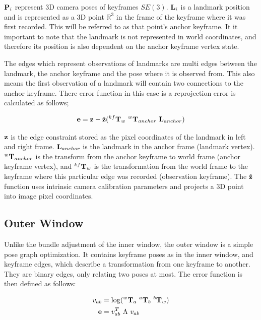 $\mathbf P_i$ represent 3D camera poses of keyframes $SE(3)$.  $\mathbf L_i$ is a landmark position and is represented as a 3D point $\mathbb{R}^3$ in the frame of the keyframe where it was first recorded.  This will be referred to as that point's anchor keyframe.  It it important to note that the landmark is not represented in world coordinates, and therefore its position is also dependent on the anchor keyframe vertex state.

The edges which represent observations of landmarks are multi edges between the landmark, the anchor keyframe and the pose where it is observed from.  This also means the first observation of a landmark will contain two connections to the anchor keyframe. There error function in this case is a reprojection error is calculated as follows;

\begin{align}
 \mathbf e = \mathbf z - \hat{\mathbf z}( ^{kf}\mathbf T_w \ ^w \mathbf T_{anchor} \ \mathbf L_{anchor})
\end{align}

$\mathbf z$ is the edge constraint stored as the pixel coordinates of the landmark in left and right frame. $\mathbf L_{anchor}$ is the landmark in the anchor frame (landmark vertex).  $^w \mathbf T_{anchor}$ is the transform from the anchor keyframe to world frame (anchor keyframe vertex), and $^{kf}\mathbf T_w$ is the transformation from the world frame to the keyframe where this particular edge was recorded (observation keyframe).  The $\hat{\mathbf z}$ function uses intrinsic camera calibration parameters and projects a 3D point into image pixel coordinates.

\subsection{Outer Window}

Unlike the bundle adjustment of the inner window, the outer window is a simple pose graph optimization.  It contains keyframe poses as in the inner window, and keyframe edges, which describe a transformation from one keyframe to another.  They are binary edges, only relating two poses at most.  The error function is then defined as follows:

\begin{align}
 v_{ab} &=  \log(^{w}\mathbf T_{a} \ ^{a} \mathbf T_{b} \ ^{b} \mathbf T_{w}) \\
 \mathbf e &= v_{ab}^T \ \Lambda \ v_{ab}
\end{align}

